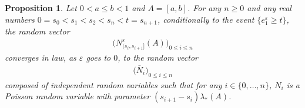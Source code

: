 \documentclass[reqno, 12pt, a4paper]{amsart}
\theoremstyle{plain}
\newtheorem{proposition}[theorem]{Proposition}
\theoremstyle{definition}
\begin{document}
\begin{proposition}
\label{prop:Poissonfinite}
Let $0<a\le b<1$ and $A=[a,b]$. For any $n\ge 0$ and any real numbers $0=s_0< s_1 < s_2 < s_n<t=s_{n+1}$, conditionally to the event $\{ e_1^\varepsilon \ge t\}$, the random vector
\begin{equation}
\begin{split}
\big( N^\varepsilon_{(s_i, s_{i+1}]} (A)  \big)_{0 \le i \le n}
\end{split}
\end{equation}
converges in law, as $\varepsilon$ goes to $0$, to the random vector 
\begin{equation}
\begin{split}
\big( {\bar N}_{i} \big)_{0 \le i \le n}
\end{split}
\end{equation}
composed of independent random variables such that for any $i \in \{0,\ldots, n\}$, $N_i$ is a Poisson random variable with parameter $(s_{i+1} -s_i) \lambda_* (A)$.
\end{proposition}
\end{document}
